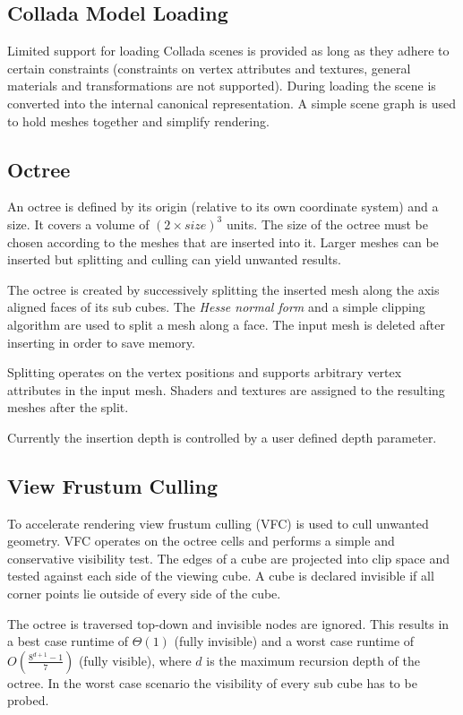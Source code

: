 \documentclass[a4, 12pt]{scrartcl}
\begin{document}
\subsection{Collada Model Loading}
Limited support for loading Collada scenes is provided as long as they adhere to certain constraints (constraints on vertex attributes and textures, general materials and transformations are not supported). During loading the scene is converted into the internal canonical representation. A simple scene graph is used to hold meshes together and simplify rendering.

\subsection{Octree}
An octree is defined by its origin (relative to its own coordinate system) and a size. It covers a volume of $(2 \times size )^3$ units. The size of the octree must be chosen according to the meshes that are inserted into it. Larger meshes can be inserted but splitting and culling can yield unwanted results.

The octree is created by successively splitting the inserted mesh along the axis aligned faces of its sub cubes. The \emph{Hesse normal form} and a simple clipping algorithm are used to split a mesh along a face. The input mesh is deleted after inserting in order to save memory.

Splitting operates on the vertex positions and supports arbitrary vertex attributes in the input mesh. Shaders and textures are assigned to the resulting meshes after the split.

Currently the insertion depth is controlled by a user defined depth parameter. 

\subsection{View Frustum Culling}
To accelerate rendering view frustum culling (VFC) is used to cull unwanted geometry. VFC operates on the octree cells and performs a simple and conservative visibility test. The edges of a cube are projected into clip space and tested against each side of the viewing cube. A cube is declared invisible if all corner points lie outside of every side of the cube. 

The octree is traversed top-down and invisible nodes are ignored. This results in a best case runtime of $\Theta(1)$ (fully invisible) and a worst case runtime of $O(\frac{8^{d+1} - 1}{7})$ (fully visible), where $d$ is the maximum recursion depth of the octree. In the worst case scenario the visibility of every sub cube has to be probed.
\end{document}
